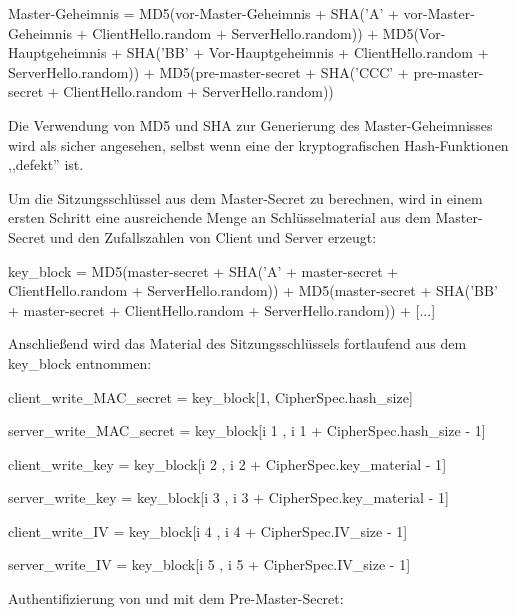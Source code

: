 \documentclass[a4paper]{article}
\begin{document}
\begin{multicols}{3}
\begin{itemize*}
\begin{itemize*}
                  \begin{itemize*}
                        \item Master-Geheimnis = MD5(vor-Master-Geheimnis + SHA('A' + vor-Master-Geheimnis + ClientHello.random + ServerHello.random)) + MD5(Vor-Hauptgeheimnis + SHA('BB' + Vor-Hauptgeheimnis + ClientHello.random + ServerHello.random)) + MD5(pre-master-secret + SHA('CCC' + pre-master-secret + ClientHello.random + ServerHello.random))
                  \end{itemize*}
                  \item
                  Die Verwendung von MD5 und SHA zur Generierung des Master-Geheimnisses
                  wird als sicher angesehen, selbst wenn eine der kryptografischen
                  Hash-Funktionen ,,defekt'' ist.
                  \item
                  Um die Sitzungsschlüssel aus dem Master-Secret zu berechnen, wird in
                  einem ersten Schritt eine ausreichende Menge an Schlüsselmaterial aus
                  dem Master-Secret und den Zufallszahlen von Client und Server erzeugt:

                  \begin{itemize*}
                        \item key\_block = MD5(master-secret + SHA('A' + master-secret + ClientHello.random + ServerHello.random)) + MD5(master-secret + SHA('BB' + master-secret + ClientHello.random + ServerHello.random)) + {[}...{]}
                  \end{itemize*}
                  \item
                  Anschließend wird das Material des Sitzungsschlüssels fortlaufend aus
                  dem key\_block entnommen:

                  \begin{itemize*}
                        \item client\_write\_MAC\_secret = key\_block{[}1, CipherSpec.hash\_size{]}
                        \item server\_write\_MAC\_secret = key\_block{[}i 1 , i 1 + CipherSpec.hash\_size - 1{]}
                        \item client\_write\_key = key\_block{[}i 2 , i 2 + CipherSpec.key\_material - 1{]}
                        \item server\_write\_key = key\_block{[}i 3 , i 3 + CipherSpec.key\_material - 1{]}
                        \item client\_write\_IV = key\_block{[}i 4 , i 4 + CipherSpec.IV\_size - 1{]}
                        \item server\_write\_IV = key\_block{[}i 5 , i 5 + CipherSpec.IV\_size - 1{]}
                  \end{itemize*}
                  \item
                  Authentifizierung von und mit dem Pre-Master-Secret:


\end{itemize*}
\end{itemize*}
\end{multicols}
\end{document}
